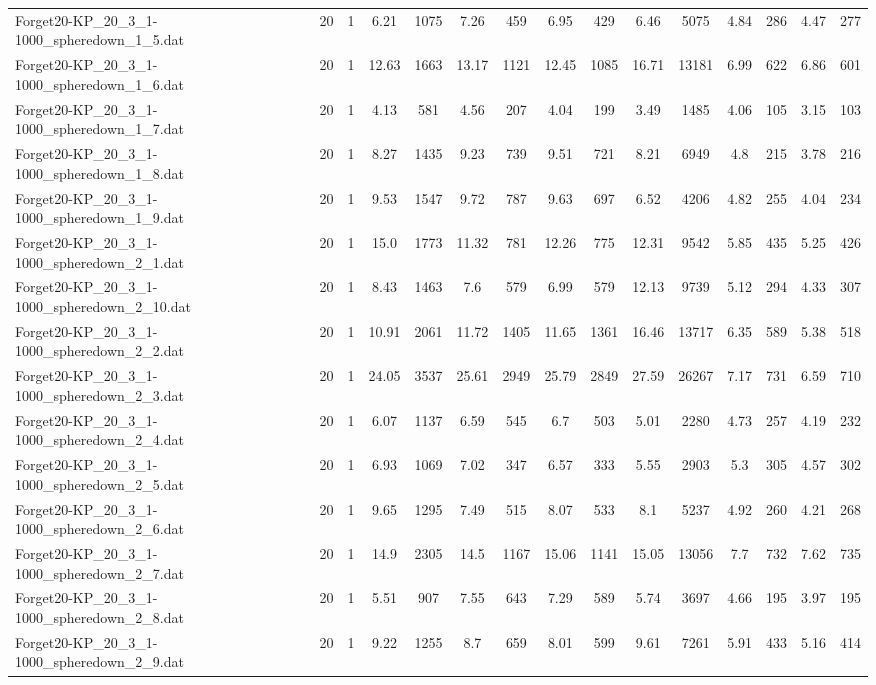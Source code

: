\begin{table}[!ht]
{\begin{tabular}{lcccccccccccccc}
Forget20-KP\_20\_3\_1-1000\_spheredown\_1\_5.dat & 20 & 1 & 6.21 & 1075 & 7.26 & 459 & 6.95 & 429 & 6.46 & 5075 & 4.84 & 286 & 4.47 & 277 \\
Forget20-KP\_20\_3\_1-1000\_spheredown\_1\_6.dat & 20 & 1 & 12.63 & 1663 & 13.17 & 1121 & 12.45 & 1085 & 16.71 & 13181 & 6.99 & 622 & 6.86 & 601 \\
Forget20-KP\_20\_3\_1-1000\_spheredown\_1\_7.dat & 20 & 1 & 4.13 & 581 & 4.56 & 207 & 4.04 & 199 & 3.49 & 1485 & 4.06 & 105 & 3.15 & 103 \\
Forget20-KP\_20\_3\_1-1000\_spheredown\_1\_8.dat & 20 & 1 & 8.27 & 1435 & 9.23 & 739 & 9.51 & 721 & 8.21 & 6949 & 4.8 & 215 & 3.78 & 216 \\
Forget20-KP\_20\_3\_1-1000\_spheredown\_1\_9.dat & 20 & 1 & 9.53 & 1547 & 9.72 & 787 & 9.63 & 697 & 6.52 & 4206 & 4.82 & 255 & 4.04 & 234 \\
Forget20-KP\_20\_3\_1-1000\_spheredown\_2\_1.dat & 20 & 1 & 15.0 & 1773 & 11.32 & 781 & 12.26 & 775 & 12.31 & 9542 & 5.85 & 435 & 5.25 & 426 \\
Forget20-KP\_20\_3\_1-1000\_spheredown\_2\_10.dat & 20 & 1 & 8.43 & 1463 & 7.6 & 579 & 6.99 & 579 & 12.13 & 9739 & 5.12 & 294 & 4.33 & 307 \\
Forget20-KP\_20\_3\_1-1000\_spheredown\_2\_2.dat & 20 & 1 & 10.91 & 2061 & 11.72 & 1405 & 11.65 & 1361 & 16.46 & 13717 & 6.35 & 589 & 5.38 & 518 \\
Forget20-KP\_20\_3\_1-1000\_spheredown\_2\_3.dat & 20 & 1 & 24.05 & 3537 & 25.61 & 2949 & 25.79 & 2849 & 27.59 & 26267 & 7.17 & 731 & 6.59 & 710 \\
Forget20-KP\_20\_3\_1-1000\_spheredown\_2\_4.dat & 20 & 1 & 6.07 & 1137 & 6.59 & 545 & 6.7 & 503 & 5.01 & 2280 & 4.73 & 257 & 4.19 & 232 \\
Forget20-KP\_20\_3\_1-1000\_spheredown\_2\_5.dat & 20 & 1 & 6.93 & 1069 & 7.02 & 347 & 6.57 & 333 & 5.55 & 2903 & 5.3 & 305 & 4.57 & 302 \\
Forget20-KP\_20\_3\_1-1000\_spheredown\_2\_6.dat & 20 & 1 & 9.65 & 1295 & 7.49 & 515 & 8.07 & 533 & 8.1 & 5237 & 4.92 & 260 & 4.21 & 268 \\
Forget20-KP\_20\_3\_1-1000\_spheredown\_2\_7.dat & 20 & 1 & 14.9 & 2305 & 14.5 & 1167 & 15.06 & 1141 & 15.05 & 13056 & 7.7 & 732 & 7.62 & 735 \\
Forget20-KP\_20\_3\_1-1000\_spheredown\_2\_8.dat & 20 & 1 & 5.51 & 907 & 7.55 & 643 & 7.29 & 589 & 5.74 & 3697 & 4.66 & 195 & 3.97 & 195 \\
Forget20-KP\_20\_3\_1-1000\_spheredown\_2\_9.dat & 20 & 1 & 9.22 & 1255 & 8.7 & 659 & 8.01 & 599 & 9.61 & 7261 & 5.91 & 433 & 5.16 & 414 \\

\end{tabular}}
\end{table}
